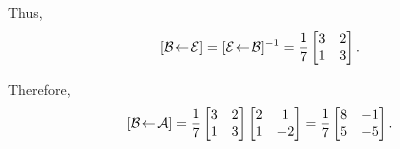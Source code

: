 \begin{exercises}
\begin{problist}
\begin{solution}
\begin{enumerate}
				Thus,
				\[
					\BasisChange{\mathcal E}{\mathcal B}=\BasisChange{\mathcal B}{\mathcal E}^{-1}=\frac{1}{7}
					\begin{bmatrix}
						3 & 2 \\ 1 & 3
					\end{bmatrix}.
				\]
				
				Therefore,
				\[
					\BasisChange{\mathcal A}{\mathcal B}=\frac{1}{7}
					\begin{bmatrix}
						3 & 2 \\ 1 & 3
					\end{bmatrix}
					\begin{bmatrix}
						2 & 1 \\ 1 & -2
					\end{bmatrix}=
					\frac{1}{7}
					\begin{bmatrix}
						8 & -1 \\ 5 & -5
					\end{bmatrix}.
				\]
				

\end{enumerate}
\end{solution}
\end{problist}
\end{exercises}
